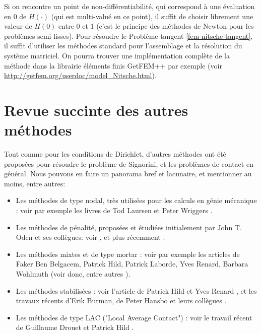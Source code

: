 \documentclass[11pt]{book}
\begin{document}
\medskip

Si on rencontre un point de non-différentiabilité, qui correspond à une évaluation en $0$ de $H(\cdot)$ (qui est multi-valué en ce point), il suffit de choisir librement une valeur de $H(0)$ entre $0$ et $1$ (c'est le principe des méthodes de Newton pour les problèmes semi-lisses).
Pour résoudre le Problème tangent \eqref{fem-nitsche-tangent},
il suffit d'utiliser les méthodes standard pour l'assemblage et la résolution du système matriciel. On pourra trouver une implémentation complète de la méthode dans la librairie éléments finis GetFEM++ par exemple (voir \url{http://getfem.org/userdoc/model_Nitsche.html}).

\section{Revue succinte des autres méthodes}

Tout comme pour les conditions de Dirichlet, d'autres méthodes ont été proposées pour résoudre le problème de Signorini, et les problèmes de contact en général. Nous pouvons en faire un panorama bref et lacunaire, et mentionner au moins, entre autres:

\begin{itemize}

\item Les méthodes de type nodal, très utilisées pour les calculs en génie mécanique : voir par exemple les livres de Tod Laursen \cite{laursen-02} et Peter Wriggers \cite{wriggers-02}.

\item Les méthodes de pénalité, proposées et étudiées initialement par John T. Oden et ses collègues: voir \cite{oden-81,kikuchi-song-81,oden-kim-82,oden-kikuchi-82,kikuchi-oden-88}, et plus récemment \cite{chernov-maischak-stephan-07,chouly-hild-12b}.

\item Les méthodes mixtes et de type mortar : voir par exemple les articles de Faker Ben Belgacem, Patrick Hild, Patrick Laborde, Yves Renard, Barbara Wohlmuth (voir donc, entre autres 
\cite{haslinger-96,hild-00,ben-belgacem-renard-03,hueber-wohlmuth-05,laborde-renard-08,wohlmuth-11}).

\item Les méthodes stabilisées : voir l'article de Patrick Hild et Yves Renard \cite{hild-renard-10}, et les travaux récents d'Erik Burman, de Peter Hansbo et leurs collègues \cite{burman-hansbo-larson-2016,hansbo-rashid-salomonsson-16}.

\item Les méthodes de type LAC ("Local Average Contact") : voir le travail récent de Guillaume Drouet et Patrick Hild \cite{drouet-hild-2017}.

\end{itemize}
\end{document}

